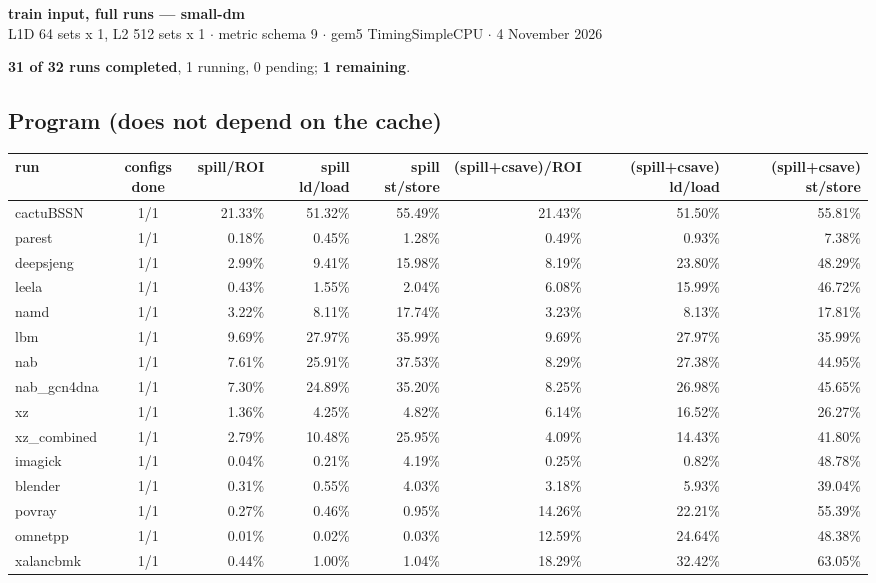 \documentclass[10pt,a4paper,landscape]{article}
\begin{document}
\begin{center}
{\large\bfseries train input, full runs --- small-dm}\\[3pt]
{\small L1D 64 sets x 1, L2 512 sets x 1 $\cdot$ metric schema 9 $\cdot$ gem5 TimingSimpleCPU $\cdot$ 4 November 2026}
\end{center}
\textbf{31 of 32 runs completed}, 1 running, 0 pending; \textbf{1 remaining}.\par
\subsection*{Program (does not depend on the cache)}
{\footnotesize
\begin{longtable}{lcrrrrrr}
\toprule
run & configs done & spill/ROI & spill ld/load & spill st/store & (spill+csave)/ROI & (spill+csave) ld/load & (spill+csave) st/store \\
\midrule
\endhead
\bottomrule
\endfoot
cactuBSSN & 1/1 & 21.33\% & 51.32\% & 55.49\% & 21.43\% & 51.50\% & 55.81\% \\
parest & 1/1 & 0.18\% & 0.45\% & 1.28\% & 0.49\% & 0.93\% & 7.38\% \\
deepsjeng & 1/1 & 2.99\% & 9.41\% & 15.98\% & 8.19\% & 23.80\% & 48.29\% \\
leela & 1/1 & 0.43\% & 1.55\% & 2.04\% & 6.08\% & 15.99\% & 46.72\% \\
namd & 1/1 & 3.22\% & 8.11\% & 17.74\% & 3.23\% & 8.13\% & 17.81\% \\
lbm & 1/1 & 9.69\% & 27.97\% & 35.99\% & 9.69\% & 27.97\% & 35.99\% \\
nab & 1/1 & 7.61\% & 25.91\% & 37.53\% & 8.29\% & 27.38\% & 44.95\% \\
nab\_gcn4dna & 1/1 & 7.30\% & 24.89\% & 35.20\% & 8.25\% & 26.98\% & 45.65\% \\
xz & 1/1 & 1.36\% & 4.25\% & 4.82\% & 6.14\% & 16.52\% & 26.27\% \\
xz\_combined & 1/1 & 2.79\% & 10.48\% & 25.95\% & 4.09\% & 14.43\% & 41.80\% \\
imagick & 1/1 & 0.04\% & 0.21\% & 4.19\% & 0.25\% & 0.82\% & 48.78\% \\
blender & 1/1 & 0.31\% & 0.55\% & 4.03\% & 3.18\% & 5.93\% & 39.04\% \\
povray & 1/1 & 0.27\% & 0.46\% & 0.95\% & 14.26\% & 22.21\% & 55.39\% \\
omnetpp & 1/1 & 0.01\% & 0.02\% & 0.03\% & 12.59\% & 24.64\% & 48.38\% \\
xalancbmk & 1/1 & 0.44\% & 1.00\% & 1.04\% & 18.29\% & 32.42\% & 63.05\% \\

\end{longtable}}
\end{document}
